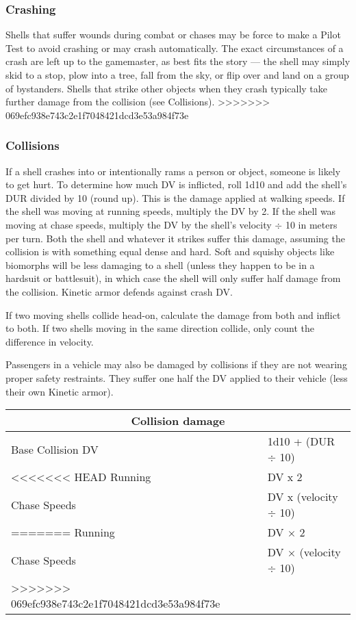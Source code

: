 \subsubsection{Crashing}

Shells that suffer wounds during combat or chases may be force to make a Pilot Test to avoid crashing or may crash automatically. The exact circumstances of a crash are left up to the gamemaster, as best fits the story --- the shell may simply skid to a stop, plow into a tree, fall from the sky, or flip over and land on a group of bystanders. Shells that strike other objects when they crash typically take further damage from the collision (see Collisions).
>>>>>>> 069efc938e743c2e1f7048421dcd3e53a984f73e

\subsubsection{Collisions}

If a shell crashes into or intentionally rams a person or object, someone is likely to get hurt. To determine how much DV is inflicted, roll 1d10 and add the shell’s DUR divided by 10 (round up). This is the damage applied at walking speeds. If the shell was moving at running speeds, multiply the DV by 2. If the shell was moving at chase speeds, multiply the DV by the shell’s velocity $\div$ 10 in meters per turn. Both the shell and whatever it strikes suffer this damage, assuming the collision is with something equal dense and hard. Soft and squishy objects like biomorphs will be less damaging to a shell (unless they happen to be in a hardsuit or battlesuit), in which case the shell will only suffer half damage from the collision. Kinetic armor defends against crash DV.

If two moving shells collide head-on, calculate the damage from both and inflict to both. If two shells moving in the same direction collide, only count the difference in velocity.

Passengers in a vehicle may also be damaged by collisions if they are not wearing proper safety restraints. They suffer one half the DV applied to their vehicle (less their own Kinetic armor).

\begin{table}
\begin{tabular}{|l|l|}
\hline
\multicolumn{2}{|c|}{\textbf{Collision damage}}	\\
\hline
Base Collision DV	& 1d10 + (DUR $\div$ 10)		\\
\hline
<<<<<<< HEAD
Running			& DV x 2					\\
\hline
Chase Speeds		& DV x (velocity $\div$ 10)	\\
=======
Running			& DV $\times$ 2					\\
\hline
Chase Speeds		& DV $\times$ (velocity $\div$ 10)	\\
>>>>>>> 069efc938e743c2e1f7048421dcd3e53a984f73e
\hline
\end{tabular}
\label{tab:collision-damage}
\end{table}

